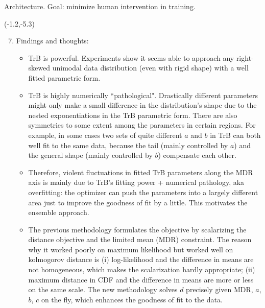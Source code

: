 \documentclass[aspectratio=169]{beamer}
\begin{document}
\begin{frame}{\normalsize Architecture. Goal: minimize human intervention in training.}
\begin{textblock}{7.7}(-1.2,-5.3)
\begin{enumerate}\setcounter{enumi}{6}
\tiny\item Findings and thoughts:\smallskip

\begin{itemize}
\tiny\item TrB is powerful. Experiments show it seems able to approach any right-skewed unimodal data distribution (even with rigid shape) with a well fitted parametric form.\smallskip%

\tiny\item TrB is highly numerically ``pathological". Drastically different parameters might only make a small difference in the distribution's shape due to the nested exponentiations in the TrB parametric form. There are also symmetries to some extent among the parameters in certain regions. For example, in some cases two sets of quite different $a$ and $b$ in TrB can both well fit to the same data, because the tail (mainly controlled by $a$) and the general shape (mainly controlled by $b$) compensate each other. \smallskip%

\tiny\item Therefore, violent fluctuations in fitted TrB parameters along the MDR axis is mainly due to TrB's fitting power + numerical pathology, aka overfitting: the optimizer can push the parameters into a largely different area just to improve the goodness of fit by a little. This motivates the ensemble approach.\smallskip%

\tiny\item The previous methodology formulates the objective by scalarizing the distance objective and the limited mean (MDR) constraint. The reason why it worked poorly on maximum likelihood but worked well on kolmogorov distance is (i) log-likelihood and the difference in means are not homogeneous, which makes the scalarization hardly appropriate; (ii) maximum distance in CDF and the difference in means are more or less on the same scale. The new methodology solves $d$ precisely given MDR, $a$, $b$, $c$ on the fly, which enhances the goodness of fit to the data.%
\end{itemize}


\end{enumerate}
\end{textblock}


\end{frame}
\end{document}
